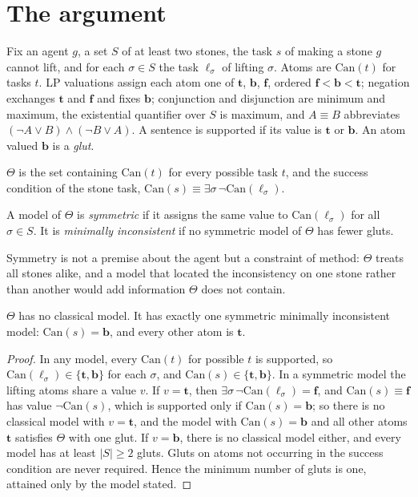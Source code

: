 \documentclass{situationist-preprint}
\begin{document}
\section{The argument}

Fix an agent $g$, a set $S$ of at least two stones, the task $s$ of making a stone $g$ cannot lift, and for each $\sigma \in S$ the task $\ell_\sigma$ of lifting $\sigma$. Atoms are $\mathrm{Can}(t)$ for tasks $t$. LP valuations assign each atom one of $\mathbf{t}$, $\mathbf{b}$, $\mathbf{f}$, ordered $\mathbf{f} < \mathbf{b} < \mathbf{t}$; negation exchanges $\mathbf{t}$ and $\mathbf{f}$ and fixes $\mathbf{b}$; conjunction and disjunction are minimum and maximum, the existential quantifier over $S$ is maximum, and $A \equiv B$ abbreviates $(\neg A \vee B) \wedge (\neg B \vee A)$. A sentence is supported if its value is $\mathbf{t}$ or $\mathbf{b}$. An atom valued $\mathbf{b}$ is a \emph{glut}.

\begin{definition}\label{d:theta}
$\Theta$ is the set containing $\mathrm{Can}(t)$ for every possible task $t$, and the success condition of the stone task, $\mathrm{Can}(s) \equiv \exists\sigma\, \neg\mathrm{Can}(\ell_\sigma)$.
\end{definition}

\begin{definition}\label{d:sym}
A model of $\Theta$ is \emph{symmetric} if it assigns the same value to $\mathrm{Can}(\ell_\sigma)$ for all $\sigma \in S$. It is \emph{minimally inconsistent} if no symmetric model of $\Theta$ has fewer gluts.
\end{definition}

Symmetry is not a premise about the agent but a constraint of method: $\Theta$ treats all stones alike, and a model that located the inconsistency on one stone rather than another would add information $\Theta$ does not contain.

\begin{theorem}\label{t:locate}
$\Theta$ has no classical model. It has exactly one symmetric minimally inconsistent model: $\mathrm{Can}(s) = \mathbf{b}$, and every other atom is $\mathbf{t}$.
\end{theorem}

\begin{proof}
In any model, every $\mathrm{Can}(t)$ for possible $t$ is supported, so $\mathrm{Can}(\ell_\sigma) \in \{\mathbf{t}, \mathbf{b}\}$ for each $\sigma$, and $\mathrm{Can}(s) \in \{\mathbf{t}, \mathbf{b}\}$. In a symmetric model the lifting atoms share a value $v$. If $v = \mathbf{t}$, then $\exists\sigma\,\neg\mathrm{Can}(\ell_\sigma) = \mathbf{f}$, and $\mathrm{Can}(s) \equiv \mathbf{f}$ has value $\neg\mathrm{Can}(s)$, which is supported only if $\mathrm{Can}(s) = \mathbf{b}$; so there is no classical model with $v = \mathbf{t}$, and the model with $\mathrm{Can}(s) = \mathbf{b}$ and all other atoms $\mathbf{t}$ satisfies $\Theta$ with one glut. If $v = \mathbf{b}$, there is no classical model either, and every model has at least $|S| \geq 2$ gluts. Gluts on atoms not occurring in the success condition are never required. Hence the minimum number of gluts is one, attained only by the model stated.
\end{proof}
\end{document}

